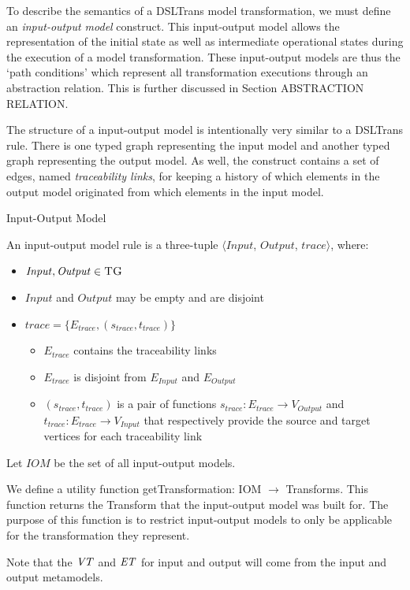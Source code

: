 To describe the semantics of a DSLTrans model transformation, we must define an \textit{input-output model} construct. This input-output model allows the representation of the initial state as well as intermediate operational states during the execution of a model transformation. These input-output models are thus the `path conditions' which represent all transformation executions through an abstraction relation. This is further discussed in Section ABSTRACTION RELATION.

The structure of a input-output model is intentionally very similar to a DSLTrans rule. There is one typed graph representing the input model and another typed graph representing the output model. As well, the construct contains a set of edges, named \emph{traceability links}, for keeping a history of which elements in the output model originated from which elements in the input model.

\begin{definition}{Input-Output Model\\}
\label{def:input_output_model}

An input-output model rule is a three-tuple $\big\langle \mathit{Input}$, $\mathit{Output}$, $\mathit{trace}\big\rangle$, where:

\begin{itemize}
\item $\mathit{Input}, \mathit{Output} \in \textsc{TG}$
\item $\mathit{Input}$ and $\mathit{Output} $ may be empty and are disjoint
\item $\mathit{trace} = \{E_{trace}, (s_{trace}, t_{trace})\}$
\begin{itemize}
\item $E_{trace}$ contains the traceability links
\item $E_{trace} $ is disjoint from $E_{Input}$ and $E_{Output}$
\item $(s_{trace}, t_{trace})$ is a pair of functions $s_{trace}: E_{trace}\rightarrow V_{\textit{Output}}$ and $t_{trace}: E_{trace}\rightarrow V_{\textit{Input}}$ that respectively provide the source and target vertices for each traceability link
\end{itemize}

\end{itemize}  

Let $\mathit{IOM}$ be the set of all input-output models.

We define a utility function getTransformation: IOM $\rightarrow$ Transforms. This function returns the Transform that the input-output model was built for. The purpose of this function is to restrict input-output models to only be applicable for the transformation they represent.

Note that the $\mathit{VT}$ and $\mathit{ET}$ for input and output will come from the input and output metamodels.  

\end{definition}


